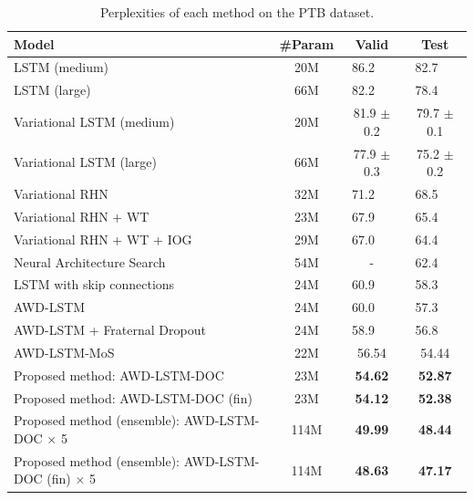 \documentclass[11pt,a4paper]{article}
\begin{document}
\begin{table}[!t]
  \centering
  \small
  \begin{tabular}{| l  | c | c c |} \hline
  Model & \#Param & Valid & Test \\ \hline
  LSTM (medium) \cite{DBLP:journals/corr/ZarembaSV14} & 20M & 86.2  \ \  & 82.7  \ \  \\
  LSTM (large) \cite{DBLP:journals/corr/ZarembaSV14} & 66M & 82.2  \ \  & 78.4  \ \  \\
  Variational LSTM (medium) \cite{Gal2016Theoretically} & 20M & 81.9 $\pm$ 0.2 & 79.7 $\pm$ 0.1 \\
  Variational LSTM (large) \cite{Gal2016Theoretically} & 66M & 77.9 $\pm$ 0.3 & 75.2 $\pm$ 0.2 \\
  Variational RHN \cite{zilly2016recurrent} & 32M & 71.2  \ \  & 68.5  \ \  \\
  Variational RHN + WT \cite{zilly2016recurrent} & 23M & 67.9  \ \  & 65.4  \ \ \\
  Variational RHN + WT + IOG \cite{takase-suzuki-nagata:2017:I17-2} & 29M & 67.0  \ \  & 64.4 \ \  \\
  Neural Architecture Search \cite{45826} & 54M & - & 62.4 \ \  \\
  LSTM with skip connections \cite{DBLP:journals/corr/MelisDB17} & 24M & 60.9  \ \  & 58.3 \ \  \\
  AWD-LSTM \cite{merityRegOpt} & 24M & 60.0  \ \  & 57.3 \ \  \\
  AWD-LSTM + Fraternal Dropout \cite{fraternal} & 24M & 58.9  \ \  & 56.8 \ \  \\
  AWD-LSTM-MoS \cite{DBLP:journals/corr/abs-1711-03953} & 22M & 56.54 & 54.44 \\ \hline
  Proposed method: AWD-LSTM-DOC & 23M & {\bf 54.62} & {\bf 52.87} \\
  Proposed method: AWD-LSTM-DOC (fin) & 23M & {\bf 54.12} & {\bf 52.38} \\
  Proposed method (ensemble): AWD-LSTM-DOC $\times$ 5 & 114M & {\bf 49.99} & {\bf 48.44} \\
  Proposed method (ensemble): AWD-LSTM-DOC (fin) $\times$ 5 & 114M & {\bf 48.63} & {\bf 47.17} \\ \hline
  \end{tabular}
  \caption{Perplexities of each method on the PTB dataset.\label{tb:perplexity}}
\end{table}
\end{document}
